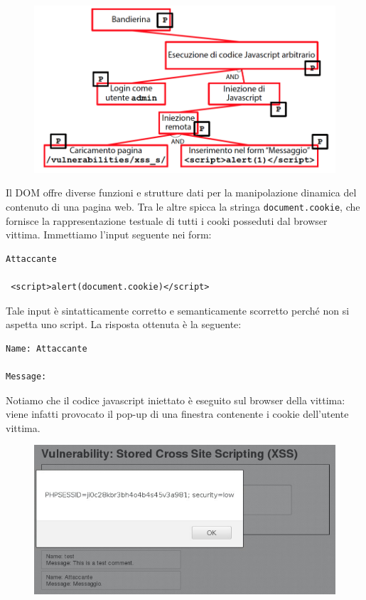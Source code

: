 \begin{figure}[hbpt!]
    \centering
    \includegraphics[width= 0.8 \textwidth]{./Images/cap6/6.7.png}
\end{figure}
\FloatBarrier

Il DOM offre diverse funzioni e strutture dati per la manipolazione dinamica del contenuto di una pagina web. Tra le altre spicca la stringa \texttt{document.cookie}, che fornisce la rappresentazione testuale di tutti i cooki posseduti dal browser vittima. Immettiamo l'input seguente nei form:
\begin{lstlisting}
Attaccante

 <script>alert(document.cookie)</script>
\end{lstlisting}

Tale input è sintatticamente corretto e semanticamente scorretto perché non si aspetta uno script. La risposta ottenuta è la seguente:
\begin{lstlisting}
Name: Attaccante

Message:
\end{lstlisting}
Notiamo che il codice javascript iniettato è eseguito sul browser della vittima: viene infatti provocato il pop-up di una finestra contenente i cookie dell'utente vittima.

\begin{figure}[hbpt!]
    \centering
    \includegraphics[width= 0.6 \textwidth]{./Images/cap6/6.8.png}
\end{figure}
\FloatBarrier

